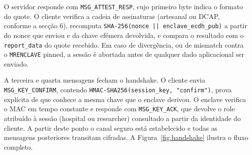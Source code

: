 O servidor responde com \texttt{MSG\_ATTEST\_RESP}, cujo primeiro byte indica o formato do quote. O cliente verifica a cadeia de assinaturas (artesanal ou DCAP, conforme a secção 6), recomputa \texttt{SHA-256(nonce || enclave\_ecdh\_pub)} a partir do nonce que enviou e da chave efémera devolvida, e compara o resultado com o \texttt{report\_data} do quote recebido. Em caso de divergência, ou de mismatch contra o \texttt{MRENCLAVE} pinned, a sessão é abortada antes de qualquer dado aplicacional ser enviado.

A terceira e quarta mensagens fecham o handshake. O cliente envia \texttt{MSG\_KEY\_CONFIRM}, contendo \texttt{HMAC-SHA256(session\_key, "confirm")}, prova explícita de que conhece a mesma chave que o enclave derivou. O enclave verifica o MAC em tempo constante e responde com \texttt{MSG\_KEY\_ACK}, que devolve o role atribuído à sessão (hospital ou researcher) consultado a partir da identidade do cliente. A partir deste ponto o canal seguro está estabelecido e todas as mensagens posteriores transitam cifradas. A Figura~\ref{fig:handshake} ilustra o fluxo completo.

